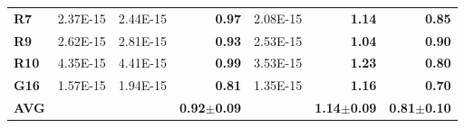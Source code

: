 \documentclass[encoding=utf8,british]{tumphthesis}
\begin{document}
\begin{table}[H]
\begin{subtable}{1.0\textwidth}
{\begin{tabular}{|l|llr|lr|r|}
\textbf{R7}                               & 2.37E-15                                             & 2.44E-15                                              & \textbf{0.97}                                    & 2.08E-15                                                       & \textbf{1.14}                                    & \textbf{0.85}                                            \\
\rowcolor[HTML]{CFE2F3} 
\textbf{R9}                               & 2.62E-15                                             & 2.81E-15                                              & \textbf{0.93}                                    & 2.53E-15                                                       & \textbf{1.04}                                    & \textbf{0.90}                                            \\
\textbf{R10}                              & 4.35E-15                                             & 4.41E-15                                              & \textbf{0.99}                                    & 3.53E-15                                                       & \textbf{1.23}                                    & \textbf{0.80}                                            \\
\rowcolor[HTML]{CFE2F3} 
\textbf{G16}                              & 1.57E-15                                             & 1.94E-15                                              & \textbf{0.81}                                    & 1.35E-15                                                       & \textbf{1.16}                                    & \textbf{0.70}                                            \\ \hline
\textbf{AVG}                             &                                                      &                                                       & \textbf{0.92$\pm$0.09}                           &                                                                & \textbf{1.14$\pm$0.09}                           & \textbf{0.81$\pm$0.10}                                  
 \\ \hline
\end{tabular}}
    \end{subtable}

    \bigskip

    \hfill


\end{table}
\end{document}
